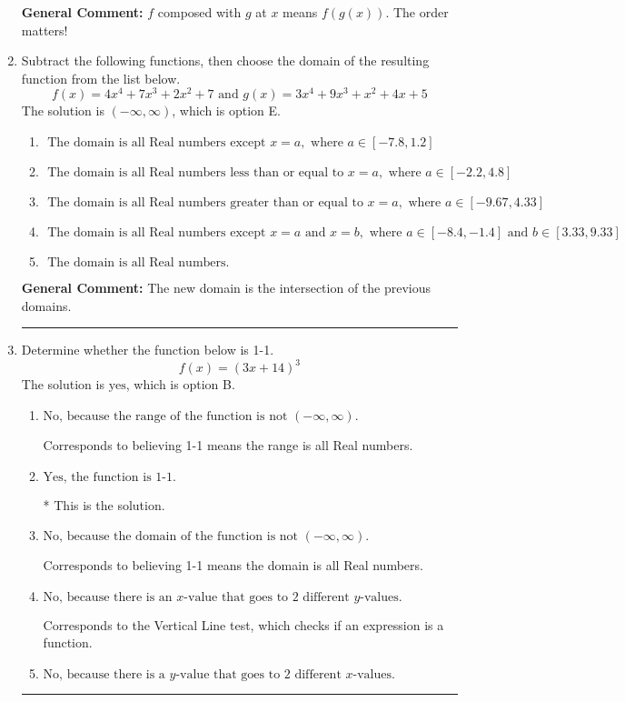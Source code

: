 \documentclass{extbook}[14pt]
\newcommand{\litem}[1]{\item #1

\rule{\textwidth}{0.4pt}}
\begin{document}
\begin{enumerate}
{\textbf{General Comment:} $f$ composed with $g$ at $x$ means $f(g(x))$. The order matters!
}
\litem{
Subtract the following functions, then choose the domain of the resulting function from the list below.
\[ f(x) = 4x^{4} +7 x^{3} +2 x^{2} + 7 \text{ and } g(x) = 3x^{4} +9 x^{3} + x^{2} +4 x + 5 \]The solution is \( (-\infty, \infty) \), which is option E.\begin{enumerate}[label=\Alph*.]
\item \( \text{ The domain is all Real numbers except } x = a, \text{ where } a \in [-7.8, 1.2] \)


\item \( \text{ The domain is all Real numbers less than or equal to } x = a, \text{ where } a \in [-2.2, 4.8] \)


\item \( \text{ The domain is all Real numbers greater than or equal to } x = a, \text{ where } a \in [-9.67, 4.33] \)


\item \( \text{ The domain is all Real numbers except } x = a \text{ and } x = b, \text{ where } a \in [-8.4, -1.4] \text{ and } b \in [3.33, 9.33] \)


\item \( \text{ The domain is all Real numbers. } \)


\end{enumerate}

\textbf{General Comment:} The new domain is the intersection of the previous domains.
}
\litem{
Determine whether the function below is 1-1.
\[ f(x) = (3 x + 14)^3 \]The solution is \( \text{yes} \), which is option B.\begin{enumerate}[label=\Alph*.]
\item \( \text{No, because the range of the function is not $(-\infty, \infty)$.} \)

Corresponds to believing 1-1 means the range is all Real numbers.
\item \( \text{Yes, the function is 1-1.} \)

* This is the solution.
\item \( \text{No, because the domain of the function is not $(-\infty, \infty)$.} \)

Corresponds to believing 1-1 means the domain is all Real numbers.
\item \( \text{No, because there is an $x$-value that goes to 2 different $y$-values.} \)

Corresponds to the Vertical Line test, which checks if an expression is a function.
\item \( \text{No, because there is a $y$-value that goes to 2 different $x$-values.} \)


\end{enumerate}}
\end{enumerate}
\end{document}
